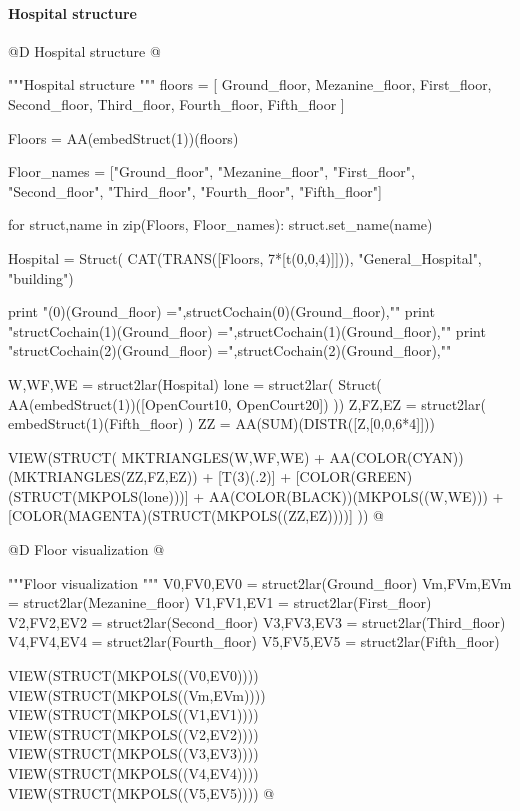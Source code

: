 \documentclass[11pt,oneside]{article}    %
\begin{document}
\paragraph{Hospital structure}
@D Hospital structure
@{"""Hospital structure """
floors = [ Ground_floor, Mezanine_floor, First_floor, 
    Second_floor, Third_floor, Fourth_floor, Fifth_floor ]

Floors = AA(embedStruct(1))(floors)

Floor_names = ["Ground_floor", "Mezanine_floor", "First_floor", 
					"Second_floor", "Third_floor", "Fourth_floor", "Fifth_floor"] 
										
for struct,name in zip(Floors, Floor_names): struct.set_name(name)

Hospital = Struct( CAT(TRANS([Floors, 7*[t(0,0,4)]])), "General_Hospital", "building")

print "\nstructCochain(0)(Ground_floor) =",structCochain(0)(Ground_floor),"\n"
print "structCochain(1)(Ground_floor) =",structCochain(1)(Ground_floor),"\n"
print "structCochain(2)(Ground_floor) =",structCochain(2)(Ground_floor),"\n"

W,WF,WE = struct2lar(Hospital)
lone = struct2lar( Struct( AA(embedStruct(1))([OpenCourt10, OpenCourt20]) ))
Z,FZ,EZ = struct2lar( embedStruct(1)(Fifth_floor) )
ZZ = AA(SUM)(DISTR([Z,[0,0,6*4]]))

VIEW(STRUCT( MKTRIANGLES(W,WF,WE) + AA(COLOR(CYAN))(MKTRIANGLES(ZZ,FZ,EZ)) + [T(3)(.2)] + [COLOR(GREEN)(STRUCT(MKPOLS(lone)))] + AA(COLOR(BLACK))(MKPOLS((W,WE))) + [COLOR(MAGENTA)(STRUCT(MKPOLS((ZZ,EZ))))] ))
@}


@D Floor visualization
@{"""Floor visualization """
V0,FV0,EV0 = struct2lar(Ground_floor)
Vm,FVm,EVm = struct2lar(Mezanine_floor)
V1,FV1,EV1 = struct2lar(First_floor)
V2,FV2,EV2 = struct2lar(Second_floor)
V3,FV3,EV3 = struct2lar(Third_floor)
V4,FV4,EV4 = struct2lar(Fourth_floor)
V5,FV5,EV5 = struct2lar(Fifth_floor)

VIEW(STRUCT(MKPOLS((V0,EV0))))
VIEW(STRUCT(MKPOLS((Vm,EVm))))
VIEW(STRUCT(MKPOLS((V1,EV1))))
VIEW(STRUCT(MKPOLS((V2,EV2))))
VIEW(STRUCT(MKPOLS((V3,EV3))))
VIEW(STRUCT(MKPOLS((V4,EV4))))
VIEW(STRUCT(MKPOLS((V5,EV5))))
@}
\end{document}
